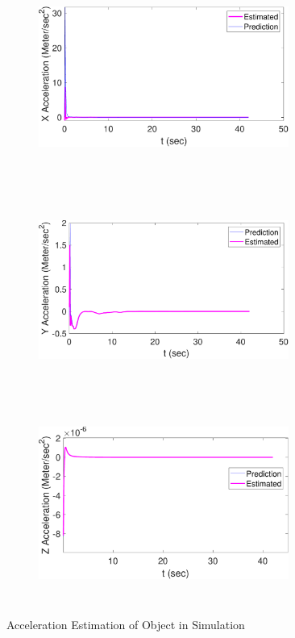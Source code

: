 \begin{figure}
    \centering
    \begin{subfigure}
        \centering
        \includegraphics[height=6.5cm,width=0.9\textwidth]{Images/X_Acce.pdf}
    \end{subfigure}
    \begin{subfigure}
        \centering
        \includegraphics[height=6.5cm,width=0.9\textwidth]{Images/Y_Acce.pdf}
    \end{subfigure}
    \begin{subfigure}
        \centering
        \includegraphics[height=6.5cm,width=0.9\textwidth]{Images/Z_Acce.pdf}
    \end{subfigure}
    \caption{Acceleration Estimation of Object in Simulation}
    \label{Accestimation}
\end{figure}


